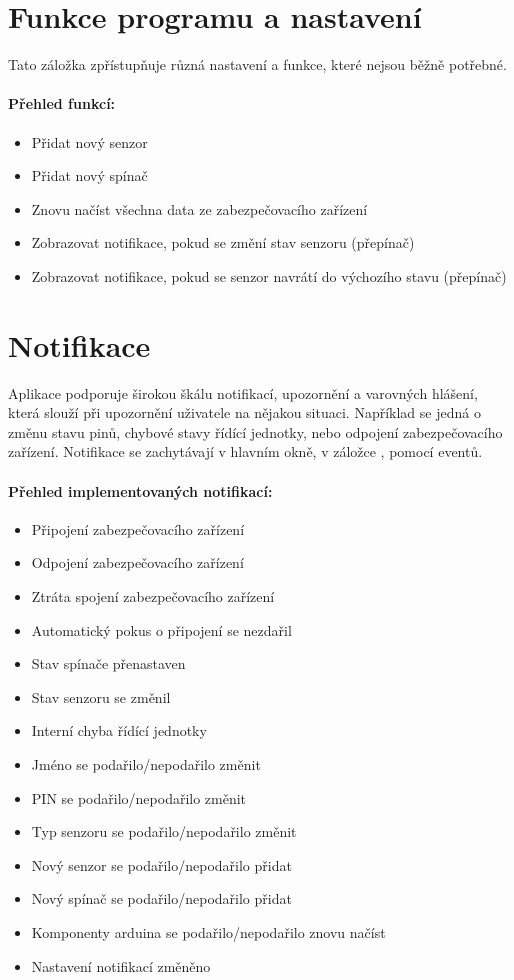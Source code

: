 \documentclass[FM,DP]{tulthesis}  %
\begin{document}
\section{Funkce programu a nastavení}
Tato záložka zpřístupňuje různá nastavení a funkce, které nejsou běžně potřebné.

\paragraph{Přehled funkcí:}
\begin{itemize}
\item Přidat nový senzor
\item Přidat nový spínač
\item Znovu načíst všechna data ze zabezpečovacího zařízení
\item Zobrazovat notifikace, pokud se změní stav senzoru (přepínač)
\item Zobrazovat notifikace, pokud se senzor navrátí do výchozího stavu (přepínač)
\end{itemize} 

\section{Notifikace}
Aplikace podporuje širokou škálu notifikací, upozornění a varovných hlášení, která slouží při upozornění uživatele na nějakou situaci. Například se jedná o změnu stavu pinů, chybové stavy řídící jednotky, nebo odpojení zabezpečovacího zařízení. Notifikace se zachytávají v hlavním okně, v záložce , pomocí eventů.

\paragraph{Přehled implementovaných notifikací:}
\begin{itemize}
\item Připojení zabezpečovacího zařízení
\item Odpojení zabezpečovacího zařízení
\item Ztráta spojení zabezpečovacího zařízení
\item Automatický pokus o připojení se nezdařil
\item Stav spínače přenastaven
\item Stav senzoru se změnil
\item Interní chyba řídící jednotky
\item Jméno se podařilo/nepodařilo změnit
\item PIN se podařilo/nepodařilo změnit
\item Typ senzoru se podařilo/nepodařilo změnit
\item Nový senzor se podařilo/nepodařilo přidat
\item Nový spínač se podařilo/nepodařilo přidat
\item Komponenty arduina se podařilo/nepodařilo znovu načíst
\item Nastavení notifikací změněno
\end{itemize} 
\end{document}

